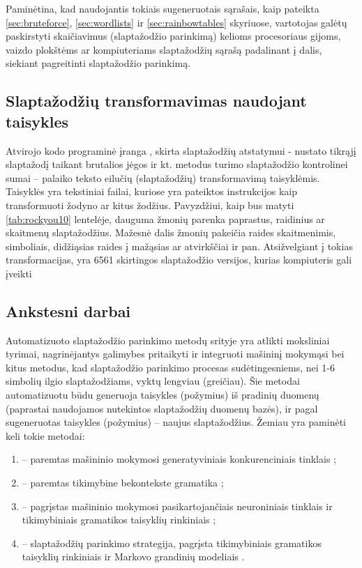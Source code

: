 \documentclass{VUMIFInfBakalaurinis}
\begin{document}
Paminėtina, kad naudojantis tokiais sugeneruotais sąrašais, kaip pateikta 
\ref{sec:bruteforce}, \ref{sec:wordlists} ir \ref{sec:rainbowtables} skyriuose, 
vartotojas galėtų paskirstyti skaičiavimus (slaptažodžio parinkimą) kelioms 
procesoriaus gijoms, vaizdo plokštėms ar kompiuteriams slaptažodžių sąrašą 
padalinant į dalis, siekiant pagreitinti slaptažodžio parinkimą.

\subsection{Slaptažodžių transformavimas naudojant taisykles}
Atvirojo kodo programinė įranga \footnotemark, skirta 
slaptažodžių atstatymui - nustato tikrąjį slaptažodį taikant brutalios jėgos ir 
kt. metodus turimo slaptažodžio kontrolinei sumai -- palaiko teksto eilučių 
(slaptažodžių) transformavimą taisyklėmis. Taisyklės yra tekstiniai failai, 
kuriose yra pateiktos instrukcijos kaip transformuoti žodyno ar kitus žodžius. 
Pavyzdžiui, kaip bus matyti \ref{tab:rockyou10} lentelėje, dauguma žmonių 
parenka paprastus, raidinius ar skaitmenų slaptažodžius. Mažesnė dalis žmonių 
pakeičia raides skaitmenimis, simboliais, didžiąsias raides į mažąsias ar 
atvirkščiai ir pan. Atsižvelgiant į tokias transformacijas, yra 6561 skirtingos 
slaptažodžio  versijos, kurias kompiuteris gali įveikti 


\subsection{Ankstesni darbai}
Automatizuoto slaptažodžio parinkimo metodų srityje yra atlikti moksliniai 
tyrimai, nagrinėjantys galimybes pritaikyti ir integruoti mašininį mokymąsi bei 
kitus metodus, kad slaptažodžio parinkimo procesas sudėtingesniems, nei 1-6 
simbolių ilgio slaptažodžiams, vyktų lengviau (greičiau). Šie metodai 
automatizuotu būdu generuoja taisykles (požymius) iš pradinių duomenų (paprastai 
naudojamos nutekintos slaptažodžių duomenų bazės), ir pagal sugeneruotas 
taisykles (požymius) -- naujus slaptažodžius. Žemiau yra paminėti keli tokie 
metodai:
\begin{enumerate}
  \item {} -- paremtas mašininio mokymosi generatyviniais 
    konkurenciniais tinklais \cite{PassGAN};
  \item {} -- paremtas tikimybine bekontekste gramatika 
    \cite{PCFG1,PCFG2};
  \item {} -- pagrįstas mašininio mokymosi pasikartojančiais 
    neuroniniais tinklais ir tikimybiniais gramatikos taisyklių rinkiniais 
    \cite{GenPASS};
  \item {} -- slaptažodžių parinkimo strategija, pagrįsta 
    tikimybiniais gramatikos taisyklių rinkiniais ir Markovo grandinių modeliais 
    \cite{TG-SPSR}.
\end{enumerate}
\end{document}

